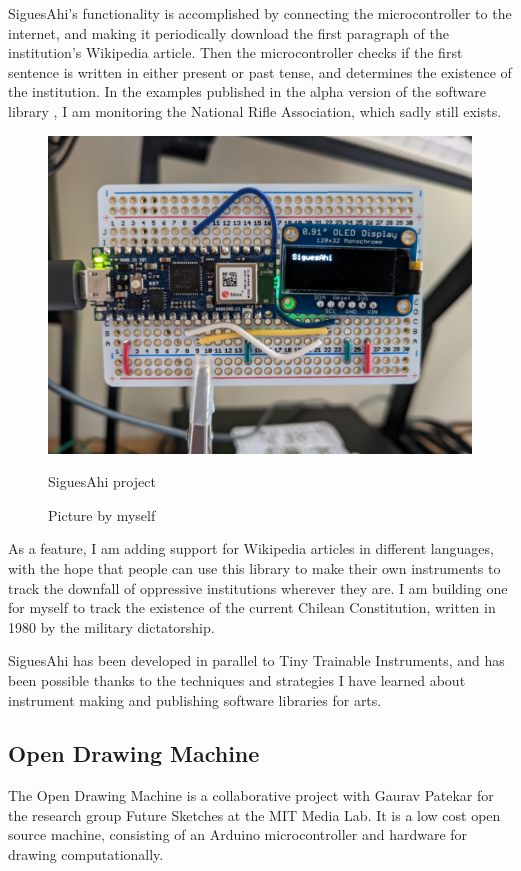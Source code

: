 SiguesAhi's functionality is accomplished by connecting the microcontroller to the internet, and making it periodically download the first paragraph of the institution's Wikipedia article. Then the microcontroller checks if the first sentence is written in either present or past tense, and determines the existence of the institution. In the examples published in the alpha version of the software library \cite{website-library-siguesahi}, I am monitoring the National Rifle Association, which sadly still exists. 

\begin{figure}[ht]
  \centering
  \includegraphics[width=0.75\linewidth,height=0.25\textheight,keepaspectratio]{images/siguesahi.jpg}
  \caption{SiguesAhi project}
  \caption*{Picture by myself}
  \label{fig:siguesahi}
\end{figure}

As a feature, I am adding support for Wikipedia articles in different languages, with the hope that people can use this library to make their own instruments to track the downfall of oppressive institutions wherever they are. I am building one for myself to track the existence of the current Chilean Constitution, written in 1980 by the military dictatorship.

SiguesAhi has been developed in parallel to Tiny Trainable Instruments, and has been possible thanks to the techniques and strategies I have learned about instrument making and publishing software libraries for arts.

\subsection{Open Drawing Machine}

The Open Drawing Machine \cite{website-open-drawing-machine} is a collaborative project with Gaurav Patekar for the research group Future Sketches at the MIT Media Lab. It is a low cost open source machine, consisting of an Arduino microcontroller and hardware for drawing computationally.


